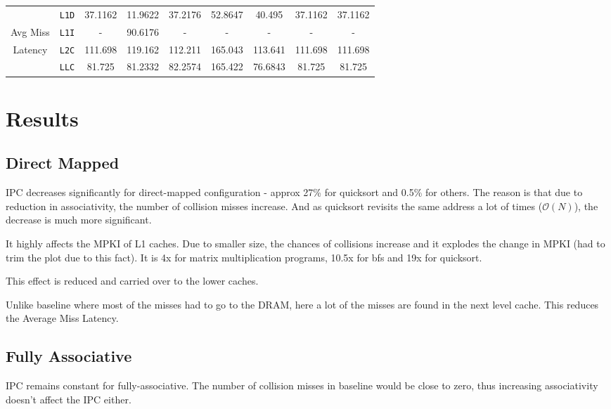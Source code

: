 \documentclass[11pt, swedish, openany]{book}
\begin{document}
\begin{table}[H]
\begin{tabular}{||c|c||c||c|c||c|c||c|c||}
        \hline
                                            & \texttt{L1D} & 37.1162                   & 11.9622  & 37.2176     & 52.8647  & 40.495   & 37.1162  & 37.1162  \\
        Avg Miss                            & \texttt{L1I} & -                         & 90.6176  & -           & -        & -        & -        & -        \\
        Latency                             & \texttt{L2C} & 111.698                   & 119.162  & 112.211     & 165.043  & 113.641  & 111.698  & 111.698  \\
                                            & \texttt{LLC} & 81.725                    & 81.2332  & 82.2574     & 165.422  & 76.6843  & 81.725   & 81.725   \\
        \hline
    \end{tabular}
\end{table}


\section{Results}
\subsection{Direct Mapped}
IPC decreases significantly for direct-mapped configuration - approx 27\% for quicksort and 0.5\% for others. The reason is that due to reduction in associativity, the number of collision misses increase. And as quicksort revisits the same address a lot of times ($\mathcal{O}(N)$), the decrease is much more significant.

It highly affects the MPKI of L1 caches. Due to smaller size, the chances of collisions increase and it explodes the change in MPKI (had to trim the plot due to this fact). It is 4x for matrix multiplication programs, 10.5x for bfs and 19x for quicksort.

This effect is reduced and carried over to the lower caches.

Unlike baseline where most of the misses had to go to the DRAM, here a lot of the misses are found in the next level cache. This reduces the Average Miss Latency.

\subsection{Fully Associative}
IPC remains constant for fully-associative. The number of collision misses in baseline would be close to zero, thus increasing associativity doesn't affect the IPC either.
\end{document}
